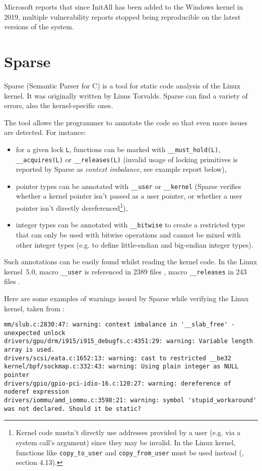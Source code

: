 \documentclass[shortabstract, manyadvisors, english, mgr]{iithesis}
\theoremstyle{definition} \newtheorem*{definition}{Definicja}
\theoremstyle{definition} \newtheorem*{example}{Przykład}
\theoremstyle{definition} \newtheorem*{remark}{Uwaga}
\begin{document}
Microsoft reports that since InitAll has been added to the Windows kernel in 2019, multiple vulnerability reports stopped being reproducible on the latest versions of the system.

\section{Sparse}
Sparse (Semantic Parser for C) \cite{bib:sparse} is a tool for static code analysis of the Linux kernel. It was originally written by Linus Torvalds. Sparse can find a variety of errors, also the kernel-specific ones.

The tool allows the programmer to annotate the code so that even more issues are detected. For instance:
\begin{itemize}
    \item for a given lock \texttt{L}, functions can be marked with \texttt{\_\_must\_hold(L)},  \texttt{\_\_acquires(L)} or \texttt{\_\_releases(L)} (invalid usage of locking primitives is reported by Sparse as \textit{context imbalance}, see example report below),
    \item pointer types can be annotated with \texttt{\_\_user} or \texttt{\_\_kernel} (Sparse verifies whether a kernel pointer isn't passed as a user pointer, or whether a user pointer isn't directly dereferenced\footnote{Kernel code mustn't directly use addresses provided by a user (e.g. via a system call's argument) since they may be invalid. In the Linux kernel, functions like \texttt{copy\_to\_user} and \texttt{copy\_from\_user} must be used instead (\cite{bib:linux-kernel-arch}, section 4.13).}),
    \item integer types can be annotated with \texttt{\_\_bitwise} to create a restricted type that can only be used with bitwise operations and cannot be mixed with other integer types (e.g. to define little-endian and big-endian integer types).
\end{itemize}

Such annotations can be easily found whilst reading the kernel code. In the Linux kernel~5.0, macro \texttt{\_\_user} is referenced in 2389 files \cite{bib:linux-user-macro}, macro \texttt{\_\_releases} in 243 files \cite{bib:linux-releases-macro}.

Here are some examples of warnings issued by Sparse while verifying the Linux kernel, taken from \cite{bib:sparse-examples}:
\begin{lstlisting}[caption=Examples of warnings generated by the Sparse tool.]
mm/slub.c:2830:47: warning: context imbalance in '__slab_free' - unexpected unlock
drivers/gpu/drm/i915/i915_debugfs.c:4351:29: warning: Variable length array is used.
drivers/scsi/eata.c:1652:13: warning: cast to restricted __be32
kernel/bpf/sockmap.c:332:43: warning: Using plain integer as NULL pointer
drivers/gpio/gpio-pci-idio-16.c:120:27: warning: dereference of noderef expression
drivers/iommu/amd_iommu.c:3598:21: warning: symbol 'stupid_workaround' was not declared. Should it be static?
\end{lstlisting}
\end{document}

